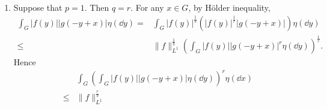 \begin{proofenv}
\begin{enumerate}
\begin{enumerate}
                    $$\begin{aligned}
                        & \int_{G} |f(y)| \cdot |g(-y+x)| \eta(\dd y)\\
                        = & \int_{G} |f(y)|^{\frac{p}{b}} \cdot |g(-y+x)|^{\frac{q}{a}}
                        \cdot \left(|f(y)|^{p} \cdot |g(-y+x)|^q\right)^{\frac{1}{r}} \eta(\dd y)\\
                        \le & \|f\|_{L^p}^{\frac{p}{b}}\cdot \|g\|_{L^q}^{\frac{q}{a}}
                        \left(\int_{G} |f(y)|^p |g(-y+x)|^q \eta(\dd y)\right)^{\frac{1}{r}}.
                    \end{aligned}$$
                    Thus
                    $$\begin{aligned}
                        & \int_{G}\left(\int_{G} |f(y)| \cdot |g(-y+x)| \eta(\dd y)\right)^r \eta(\dd x)\\
                        \le & \|f\|_{L^p}^{\frac{pr}{b}} \cdot \|g\|_{L^q}^{\frac{qr}{a}}
                        \int_{G}\int_{G} |f(y)|^p |g(-y+x)|^q \eta(\dd y)\eta(\dd x)\\
                        = & \|f\|_{L^p}^{\frac{pr}{b}} \cdot \|g\|_{L^q}^{\frac{qr}{a}}
                        \int_{G} |f(y)|^p\int_{G}|g(-y+x)|^q \eta(\dd x)\eta(\dd y)\\
                        = & \|f\|_{L^p}^{\frac{pr}{b}} \cdot \|g\|_{L^q}^{\frac{qr}{a}}
                        \|f\|_{L^p}^p \cdot \|g\|_{L^q}^q\\
                        = & \|f\|_{L^p}^r \cdot \|g\|_{L^q}^r.
                    \end{aligned}$$
                \item Suppose that $p=1$. Then $q=r$.
                    For any $x \in G$, by Hölder inequality,
                    $$\begin{aligned}
                        \int_G |f(y)| |g(-y+x)| \eta(\dd y)
                        = & \int_G |f(y)|^{\frac{1}{b}}\left(|f(y)|^{\frac{1}{r}} |g(-y+x)|\right)\eta(\dd y)\\
                        \le & \|f\|_{L^1}^{\frac{1}{b}}
                        \left(\int_G |f(y)| |g(-y+x)|^r \eta(\dd y)\right)^{\frac{1}{r}}.
                    \end{aligned}$$
                    Hence
                    $$\begin{aligned}
                        & \int_G\left(\int_G |f(y)| |g(-y+x)|\eta(\dd y)\right)^r \eta(\dd x)\\
                        \le & \|f\|_{L^1}^{\frac{r}{b}}

\end{aligned}$$
\end{enumerate}
\end{enumerate}
\end{proofenv}
